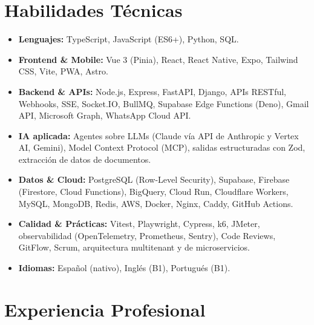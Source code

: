 \documentclass[11pt,a4paper]{article}
\begin{document}
\section*{Habilidades Técnicas}
\begin{itemize}[leftmargin=*, noitemsep]
    \item \textbf{Lenguajes:} TypeScript, JavaScript (ES6+), Python, SQL.
    \item \textbf{Frontend \& Mobile:} Vue 3 (Pinia), React, React Native, Expo, Tailwind CSS, Vite, PWA, Astro.
    \item \textbf{Backend \& APIs:} Node.js, Express, FastAPI, Django, APIs RESTful, Webhooks, SSE, Socket.IO, BullMQ, Supabase Edge Functions (Deno), Gmail API, Microsoft Graph, WhatsApp Cloud API.
    \item \textbf{IA aplicada:} Agentes sobre LLMs (Claude vía API de Anthropic y Vertex AI, Gemini), Model Context Protocol (MCP), salidas estructuradas con Zod, extracción de datos de documentos.
    \item \textbf{Datos \& Cloud:} PostgreSQL (Row-Level Security), Supabase, Firebase (Firestore, Cloud Functions), BigQuery, Cloud Run, Cloudflare Workers, MySQL, MongoDB, Redis, AWS, Docker, Nginx, Caddy, GitHub Actions.
    \item \textbf{Calidad \& Prácticas:} Vitest, Playwright, Cypress, k6, JMeter, observabilidad (OpenTelemetry, Prometheus, Sentry), Code Reviews, GitFlow, Scrum, arquitectura multitenant y de microservicios.
    \item \textbf{Idiomas:} Español (nativo), Inglés (B1), Portugués (B1).
\end{itemize}

\section*{Experiencia Profesional}
\end{document}
